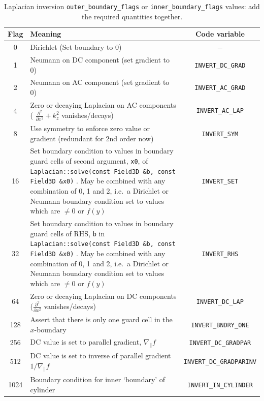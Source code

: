 \documentclass[12pt]{article}
\newcommand{\code}[1]{\texttt{#1}}
\begin{document}
\begin{table}
\caption{Laplacian inversion \code{outer\_boundary\_flags} or
\code{inner\_boundary\_flags} values: add the required quantities together.}
%
\label{tab:laplaceBCflags}
%
\centering
%
\begin{tabular}[c]{c|p{10cm}|c}
    \hline
    Flag & Meaning & Code variable\\
     &
    Dirichlet (Set boundary to 0) &
    $-$
    \\
    1 &
    Neumann on DC component (set gradient to 0) &
    \code{INVERT\_DC\_GRAD}
    \\
    2 &
    Neumann on AC component (set gradient to 0) &
    \code{INVERT\_AC\_GRAD}
    \\
    4 &
    Zero or decaying Laplacian on AC components ( $\frac{\partial^2}{\partial
    x^2}+k_z^2$ vanishes/decays) &
    \code{INVERT\_AC\_LAP}
    \\
    8 &
    Use symmetry to enforce zero value or gradient (redundant for 2nd order
    now) &
    \code{INVERT\_SYM}
    \\
    16 &
    Set boundary condition to values in boundary guard cells of second
    argument, \code{x0}, of
    \lstinline!Laplacian::solve(const Field3D &b, const Field3D &x0)!
    .  May be combined with any combination of 0, 1 and 2, i.e.\ a Dirichlet or
    Neumann boundary condition set to values which are $\neq 0$ or $f(y)$ &
    \code{INVERT\_SET}
    \\
    32 &
    Set boundary condition to values in boundary guard cells of RHS, \code{b}
    in
    \lstinline!Laplacian::solve(const Field3D &b, const Field3D &x0)!
    .  May be combined with any combination of 0, 1 and 2, i.e.\ a Dirichlet or
    Neumann boundary condition set to values which are $\neq 0$ or $f(y)$ &
    \code{INVERT\_RHS}
    \\
    64 &
    Zero or decaying Laplacian on DC components ($\frac{\partial^2}{\partial
    x^2}$ vanishes/decays) &
    \code{INVERT\_DC\_LAP}
    \\
    128 &
    Assert that there is only one guard cell in the $x$-boundary &
    \code{INVERT\_BNDRY\_ONE}
    \\
    256 &
    DC value is set to parallel gradient, $\nabla_\parallel f$ &
    \code{INVERT\_DC\_GRADPAR}
    \\
    512 &
    DC value is set to inverse of parallel gradient $1/\nabla_\parallel f$ &
    \code{INVERT\_DC\_GRADPARINV}
    \\
    1024 &
    Boundary condition for inner `boundary' of cylinder &
    \code{INVERT\_IN\_CYLINDER}
    \\
    \hline
\end{tabular}
%
\end{table}
\end{document}

